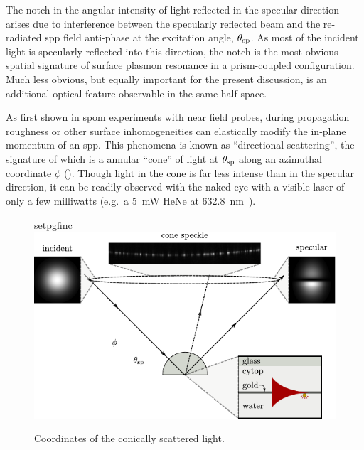 The notch in the angular intensity of light reflected in the specular
direction arises due to interference between the specularly reflected beam
and the re-radiated \gls{spp} field anti-phase at the excitation angle,
$\theta_\mathrm{sp}$.  As most of the incident light is specularly reflected into
this direction, the notch is the most obvious spatial signature of surface
plasmon resonance in a prism-coupled configuration.  Much less obvious, but
equally important for the present discussion, is an additional optical
feature observable in the same half-space.

As first shown in \gls{spom} experiments with near field probes, during propagation
roughness or other surface inhomogeneities can elastically modify the
in-plane momentum of an \gls{spp}\@.  This phenomena is known as ``directional
scattering'', the signature of which is a annular ``cone'' of light at
$\theta_\mathrm{sp}$ along an azimuthal coordinate $\phi$ ().
Though light in the cone is far less intense than in the specular
direction, it can be readily observed with the naked eye with a visible
laser of only a few milliwatts (e.g.\ a \SI{5}{\milli\watt} HeNe at
\SI{632.8}{\nano\meter}~\cite{schumann2009surface}).
\begin{figure}[ht]
  \centering
  {setpgfinc}
  \includegraphics{existence/figures/conefig}
  \caption{Coordinates of the conically scattered light.}
\label{fig:conefig}
\end{figure}

